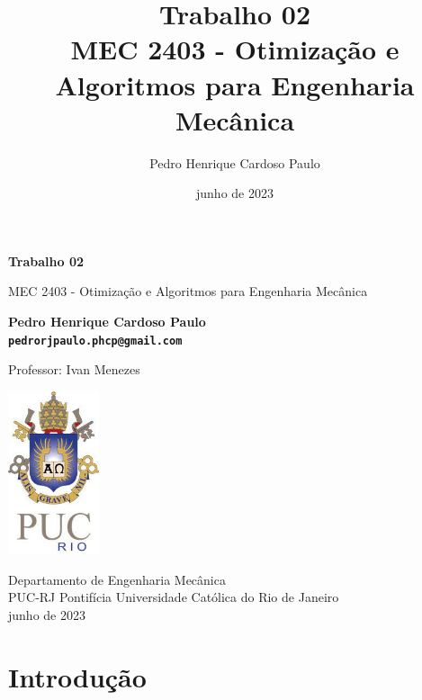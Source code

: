 \documentclass[10pt, a4paper]{article}
\begin{document}
\def\TITLE{Trabalho 02}
\def\DISCIPLINE{MEC 2403 - Otimização e Algoritmos para Engenharia Mecânica}
\def\PROFESSOR{Ivan Menezes}
\def\AUTHOR{Pedro Henrique Cardoso Paulo}
\def\CONTACT{pedrorjpaulo.phcp@gmail.com}
\def\DATE{junho de 2023}

\title{\textbf{\TITLE} \\ \DISCIPLINE}
\author{\AUTHOR}
\date{\DATE}

\begin{titlepage}
      \begin{center}
          \vspace*{1cm}

          \Huge
          \textbf{\TITLE}

          \vspace{0.5cm}
          \LARGE
          \DISCIPLINE

          \vspace{1.5cm}

          \textbf{\AUTHOR \\ {\tt \CONTACT}}

          \vfill
          Professor: \PROFESSOR

          \vspace{0.8cm}

          \includegraphics[width=0.2\textwidth]{../general/puc.jpg}

          \Large
          Departamento de Engenharia Mecânica\\
          PUC-RJ Pontifícia Universidade Católica do Rio de Janeiro\\
          \DATE

      \end{center}
  \end{titlepage}

\maketitle

\section{Introdução}
\end{document}
